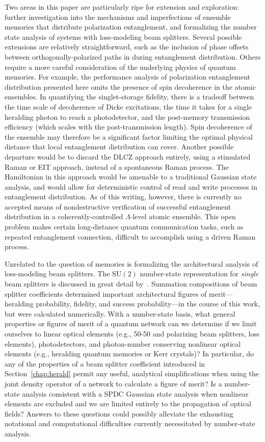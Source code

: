 \documentclass[aps,twocolumn,secnumarabic,amsmath,amssymb,pra,groupedaddress,
showpacs, showkeys,draft]{revtex4-1}
\newcommand{\pna}[1]{\left(#1\right)}
\begin{document}
Two areas in this paper are particularly ripe for extension and exploration:
further investigation into the mechanisms and imperfections of ensemble
memories that distribute polarization entanglement, and formalizing the number
state analysis of systems with loss-modeling beam splitters. Several possible
extensions are relatively straightforward, such as the inclusion of phase
offsets between orthogonally-polarized paths in during entanglement
distribution. Others require a more careful consideration of the underlying
physics of quantum memories. For example, the performance analysis of
polarization entanglement distribution presented here omits the presence of
spin decoherence in the atomic ensembles. In quantifying the singlet-storage
fidelity, there is a tradeoff between the time scale of decoherence of Dicke
excitations, the time it takes for a single heralding photon to reach a
photodetector, and the post-memory transmission efficiency (which scales with
the post-transmission length). Spin decoherence of the ensemble may therefore
be a significant factor limiting the optimal physical distance that local
entanglement distribution can cover. Another possible departure would be to
discard the DLCZ approach entirely, using a stimulated Raman or EIT approach,
instead of a spontaneous Raman process. The Hamiltonian in this approach would
be amenable to a traditional Gaussian state analysis, and would allow for
deterministic control of read and write processes in entanglement
distribution. As of this writing, however, there is currently no accepted means
of nondestructive verification of successful entanglement distribution in a
coherently-controlled $\Lambda$-level atomic ensemble. This open problem makes
certain long-distance quantum communication tasks, such as repeated
entanglement connection, difficult to accomplish using a driven Raman process.

Unrelated to the question of memories is formalizing the architectural analysis
of loss-modeling beam splitters. The $\textrm{SU}\pna{2}$ number-state
representation for \emph{single} beam splitters is discussed in great detail
by~\cite{PhysRevA.40.1371}. Summation compositions of beam splitter
coefficients determined important architectural figures of merit---heralding
probability, fidelity, and success probability---in the course of this work,
but were calculated numerically. With a number-state basis, what general
properties or figures of merit of a quantum network can we determine if we
limit ourselves to linear optical elements (e.g., 50-50 and polarizing beam
splitters, loss elements), photodetectors, and photon-number conserving
nonlinear optical elements (e.g., heralding quantum memories or Kerr crystals)?
In particular, do any of the properties of a beam splitter coefficient
introduced in Section~\ref{chap:herald} permit any useful, analytical
simplifications when using the joint density operator of a network to calculate
a figure of merit? Is a number-state analysis consistent with a SPDC Gaussian
state analysis when nonlinear elements are excluded and we are limited entirely
to the propagation of optical fields? Answers to these questions could possibly
alleviate the exhausting notational and computational difficulties currently
necessitated by number-state analysis.
\end{document}
